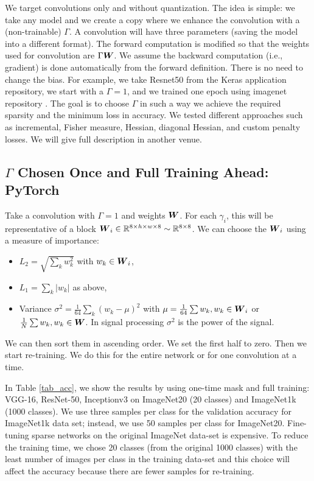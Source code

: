 \documentclass[sigconf]{acmart}
\begin{document}
We target convolutions only and without quantization. The idea is
simple: we take any model and we create a copy where we enhance the
convolution with a (non-trainable) $\Gamma$. A convolution will have
three parameters (saving the model into a different format).  The
forward computation is modified so that the weights used for
convolution are $\Gamma{\boldsymbol W}$. We assume the backward computation
(i.e., gradient) is done automatically from the forward
definition. There is no need to change the bias. For example, we take
Resnet50 from the Keras application repository, we start with a
$\Gamma=1$, and we trained one epoch using imagenet repository
\cite{deng2009imagenet}.  The goal is to choose $\Gamma$ in such a way
we achieve the required sparsity and the minimum loss in accuracy. We
tested different approaches such as incremental, Fisher measure,
Hessian, diagonal Hessian, and custom penalty losses. We will give
full description in another venue.

\subsection{$\Gamma$ Chosen Once and Full Training Ahead: PyTorch}
\label{sec:one-mask}
\label{sec:pytorch}
Take a convolution with $\Gamma = 1$ and weights ${\boldsymbol W}$. For each
$\gamma_i$, this will be representative of a block ${\boldsymbol W}_i \in \mathbb{R}^{8
  \times h \times w \times 8} \sim \mathbb{R}^{8\times 8}$. We can choose the
${\boldsymbol W}_i$ using a measure of importance:
\begin{itemize}
  \item $L_2 = \sqrt{\sum_k w_k^2}$ with $w_k \in {\boldsymbol W}_i$,
  \item $L_1 = \sum_k |w_k|$ as above,
  \item Variance $\sigma^2 = \frac{1}{64}\sum_k (w_k -\mu)^2$ with
    $\mu = \frac{1}{64}\sum w_k, w_k \in {\boldsymbol W}_i $ or $\frac{1}{N}\sum
    w_k, w_k \in {\boldsymbol W}$. In signal processing $\sigma^2$ is the power
    of the signal.
\end{itemize}
We can then sort them in ascending order. We set the first half to
zero.  Then we start re-training. We do this for the entire network or
for one convolution at a time.

In Table \ref{tab_acc}, we show the results by using one-time mask
and full training: VGG-16, ResNet-50, Inceptionv3 on ImageNet20 (20
classes) and ImageNet1k (1000 classes).  We use three samples per
class for the validation accuracy for ImageNet1k data set; instead, we
use 50 samples per class for ImageNet20. Fine-tuning sparse networks
on the original ImageNet data-set \cite{deng2009imagenet} is
expensive. To reduce the training time, we chose 20 classes (from the
original 1000 classes) with the least number of images per class in
the training data-set and this choice will affect the accuracy because
there are fewer samples for re-training.
\end{document}
